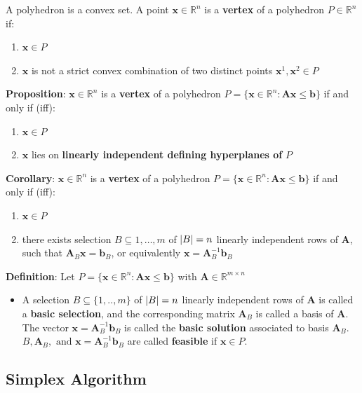 \documentclass[11pt]{article}
\DeclarePairedDelimiter\abs{\lvert}{\rvert}
\begin{document}
\noindent
A polyhedron is a convex set. A point $\textbf{x}\in\mathbb{R}^n$ is a \textbf{vertex} of a polyhedron $P\in\mathbb{R}^n$ if:
\begin{enumerate}[label=\roman*)]
	\item $\textbf{x}\in P$
	\item $\textbf{x}$ is not a strict convex combination of two distinct points $\textbf{x}^1, \textbf{x}^2 \in P$
\end{enumerate}

\noindent
\textbf{Proposition}: $\textbf{x}\in\mathbb{R}^n$ is a \textbf{vertex} of a polyhedron $P=\{ \textbf{x}\in\mathbb{R}^n:\textbf{A}\textbf{x}\leq\textbf{b}\}$ if and only if (iff):
\begin{enumerate}[label=\roman*)]
	\item $\textbf{x}\in P$
	\item $\textbf{x}$ lies on \textbf{ linearly independent defining hyperplanes of} $P$
\end{enumerate}

\noindent
\textbf{Corollary}: $\textbf{x}\in\mathbb{R}^n$ is a \textbf{vertex} of a polyhedron $P=\{ \textbf{x}\in\mathbb{R}^n:\textbf{A}\textbf{x}\leq\textbf{b}\}$ if and only if (iff):
\begin{enumerate}[label=\roman*)]
	\item $\textbf{x}\in P$
	\item there exists selection $B \subseteq {1,\dots,m}$ of $\abs{B} = n$ linearly independent rows of $\textbf{A}$, such that $\textbf{A}_B\textbf{x} = \textbf{b}_B$, or equivalently $\textbf{x} = \textbf{A}_B^{-1} \textbf{b}_B$
\end{enumerate}

\noindent
\textbf{Definition}: Let $P=\{ \textbf{x}\in\mathbb{R}^n:\textbf{A}\textbf{x}\leq\textbf{b}\}$ with $\textbf{A}\in\mathbb{R}^{m\times n}$
\begin{itemize}[label=]
	\item A selection $B\subseteq\{ 1,..,m \}$ of $\abs{B} = n$ linearly independent rows of $\textbf{A}$ is called a \textbf{basic selection}, and the corresponding matrix $\textbf{A}_B$ is called a basis of $\textbf{A}$. The vector $\textbf{x} = \textbf{A}_B^{-1}\textbf{b}_B$ is called the \textbf{basic solution} associated to basis $\textbf{A}_B$. $B, \textbf{A}_B, \text{ and } \textbf{x} = \textbf{A}_B^{-1}\textbf{b}_B$ are called \textbf{feasible} if $\textbf{x}\in P$.
\end{itemize}

\subsection{Simplex Algorithm}
\end{document}
